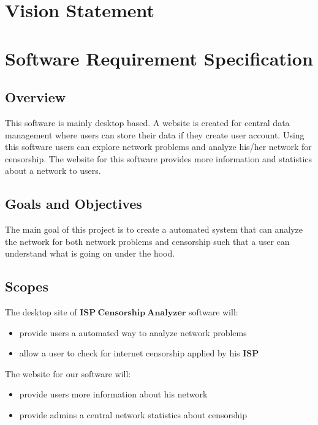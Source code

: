 \documentclass[12pt]{article}
\begin{document}
\newpage
\tableofcontents
\newpage
\listoffigures
\newpage


\section{Vision Statement}

\section{Software Requirement Specification}
\subsection{Overview}
This software is mainly desktop based. A website is created for central data management where users can store their data if they create user account. Using this software users can explore network problems and analyze his/her network for censorship. The website for this software provides more information and statistics about a network to users.
\subsection{Goals and Objectives}
The main goal of this project is to create a automated system that can analyze the network for both network problems and censorship such that a user can understand what is going on under the hood. 
\subsection{Scopes}
The desktop site of $\boldsymbol{ISP\ Censorship\ Analyzer}$ software will:
\begin{itemize}
  \item provide users a automated way to analyze network problems
  \item allow a user to check for internet censorship applied by his $\boldsymbol{ISP}$
\end{itemize}
The website for our software will:
\begin{itemize}
  \item provide users more information about his network
  \item provide admins a central network statistics about censorship 
\end{itemize}
\end{document}
